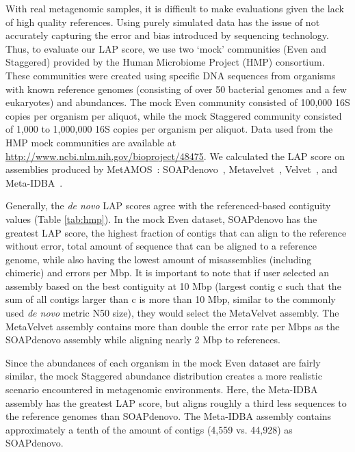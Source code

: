 \documentclass[conference]{IEEEtran}
\begin{document}
With real metagenomic samples, it is difficult to make evaluations given the lack of high quality references.
Using purely simulated data has the issue of not accurately capturing the error and bias introduced by sequencing technology.
Thus, to evaluate our LAP score, we use two `mock' communities (Even and Staggered) provided by the Human Microbiome Project (HMP) consortium\cite{mitreva2012structure,methe2012framework}.
These communities were created using specific DNA sequences from organisms with known reference genomes (consisting of over 50 bacterial genomes and a few eukaryotes) and abundances.
The mock Even community consisted of 100,000 16S copies per organism per aliquot, while the mock Staggered community consisted of 1,000 to 1,000,000 16S copies per organism per aliquot.
Data used from the HMP mock communities are available at \url{http://www.ncbi.nlm.nih.gov/bioproject/48475}.
We calculated the LAP score on assemblies produced by MetAMOS~\cite{treangen2013metamos}: SOAPdenovo~\cite{SOAPdenovo}, Metavelvet~\cite{namiki2012metavelvet}, Velvet~\cite{Velvet}, and Meta-IDBA~\cite{peng2011meta}.

Generally, the \emph{de novo} LAP scores agree with the referenced-based contiguity values (Table \ref{tab:hmp}).
In the mock Even dataset, SOAPdenovo has the greatest LAP score, the highest fraction of contigs that can align to the reference without error, total amount of sequence that can be aligned to a reference genome, while also having the lowest amount of misassemblies (including chimeric) and errors per Mbp.
It is important to note that if user selected an assembly based on the best contiguity at 10 Mbp (largest contig c such that the sum of all contigs larger than c is more than 10 Mbp, similar to the commonly used \emph{de novo} metric N50 size), they would select the MetaVelvet assembly.
The MetaVelvet assembly contains more than double the error rate per Mbps as the SOAPdenovo assembly while aligning nearly 2 Mbp to references.

Since the abundances of each organism in the mock Even dataset are fairly similar, the mock Staggered abundance distribution creates a more realistic scenario encountered in metagenomic environments.
Here, the Meta-IDBA assembly has the greatest LAP score, but aligns roughly a third less sequences to the reference genomes than SOAPdenovo.
The Meta-IDBA assembly contains approximately a tenth of the amount of contigs (4,559 vs. 44,928) as SOAPdenovo.


\end{document}
